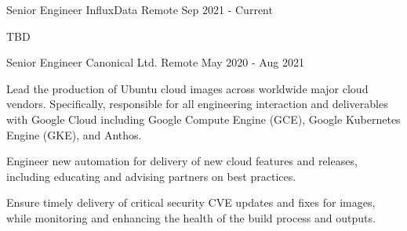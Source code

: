 

\begin{cventries}

  \cventry
    {Senior Engineer}
    {InfluxData}
    {Remote}
    {Sep 2021 - Current}
    {
      \begin{cvitems}
        \item {
          TBD
        }
      \end{cvitems}
    }
    {}

  \cventry
    {Senior Engineer}
    {Canonical Ltd.}
    {Remote}
    {May 2020 - Aug 2021}
    {
      \begin{cvitems}
        \item {
          Lead the production of Ubuntu cloud images across worldwide major
          cloud vendors. Specifically, responsible for all engineering
          interaction and deliverables with Google Cloud including Google
          Compute Engine (GCE), Google Kubernetes Engine (GKE), and Anthos.
        }
        \item {
          Engineer new automation for delivery of new cloud features and
          releases, including educating and advising partners on best
          practices.
        }
        \item {
          Ensure timely delivery of critical security CVE updates and fixes
          for images, while monitoring and enhancing the health of the build
          process and outputs.
        }
      \end{cvitems}
    }
    {}


\end{cventries}
